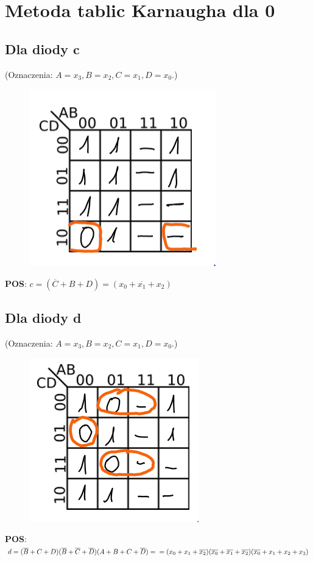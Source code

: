 \documentclass[]{article}
\begin{document}
\section{Metoda tablic Karnaugha dla 0}
\subsection{Dla diody c}
(Oznaczenia: $A=x_{3}, B=x_{2}, C=x_{1}, D=x_{0}$.)
\begin{figure}[H]
	\centering
	\includegraphics{c.png}
\end{figure}
\textbf{POS}: $c = (\overline{C}+B+D)=(x_{0}+\overline{x_{1}}+x_{2})$
\subsection{Dla diody d}
(Oznaczenia: $A=x_{3}, B=x_{2}, C=x_{1}, D=x_{0}$.)
\begin{figure}[H]
	\centering
	\includegraphics{d.png}
\end{figure}
\textbf{POS}: $d = (\overline{B}+C+D)(\overline{B}+\overline{C}+\overline{D})(A+B+C+\overline{D})=\\=(x_{0}+x_{1}+\overline{x_{2}})(\overline{x_{0}}+\overline{x_{1}}+\overline{x_{2}})
(\overline{x_{0}}+x_{1}+x_{2}+x_{3})$
\newpage
\end{document}
